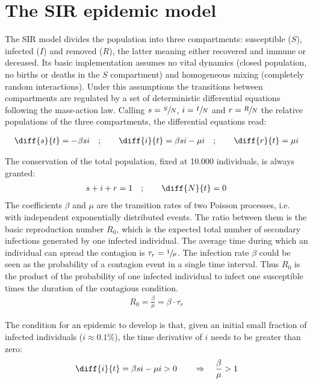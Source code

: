 \documentclass[DIV=12, BCOR=0pt]{scrartcl}  %
\begin{document}
  
  
  
  \section{The SIR epidemic model}
  The SIR model divides the population into three compartments: susceptible ($S$), infected ($I$) and removed ($R$), the latter meaning either recovered and immune or deceased. Its basic implementation assumes no vital dynamics (closed population, no births or deaths in the $S$ compartment) and homogeneous mixing (completely random interactions). Under this assumptions the transitions between compartments are regulated by a set of deterministic differential equations following the mass-action law. Calling $s = \sfrac{S}{N}$, $i = \sfrac{I}{N}$ and $r = \sfrac{R}{N}$ the relative populations of the three compartments, the differential equations read:
  
  \begin{align}
  	\diff{s}{t} = - \beta s i \quad;  \qquad 	\diff{i}{t} = \beta s i - \mu i \quad; \qquad  \diff{r}{t} = \mu i
  \end{align}
  
  The conservation of the total population, fixed at 10.000 individuals, is always granted: %
  \begin{align}
  	s + i + r = 1 \quad ; \qquad \diff{N}{t}= 0
  \end{align}
  The coefficients $\beta$ and $\mu$ are the transition rates of two Poisson processes, i.e. with independent exponentially distributed events. The ratio between them is the basic reproduction number $R_{0}$, which is the expected total number of secondary infections generated by one infected individual.   
  The average time during which an individual can spread the contagion is $\tau_{r} = \sfrac{1}{\mu}$. The infection rate $\beta$ could be seen as the probability of a contagion event in a single time interval. Thus $R_{0}$ is the product of the probability of one infected individual to infect one susceptible times the duration of the contagious condition.
  \begin{align}
			R_{0} = \frac{\beta}{\mu} = \beta \cdot \tau_{r}
  \end{align}
  
  The condition for an epidemic to develop is that, given an initial small fraction of infected individuals ($i \approx 0.1 \%$), the time derivative of $i$ needs to be greater than zero:
  \begin{align}
  	\diff{i}{t} = \beta s i - \mu i > 0 \qquad \Rightarrow \quad 	\frac{\beta}{\mu} > 1  %
  \end{align}
  
\end{document}
